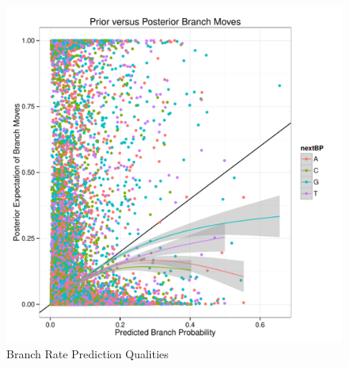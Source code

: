 \documentclass[DIV=calc, paper=a4, fontsize=11pt, twocolumn]{scrartcl}	 %
\begin{document}
\begin{figure}[ht]
\includegraphics[width=\linewidth]{BranchMoves}
\caption{Branch Rate Prediction Qualities}
\end{figure}


\
\end{document}
